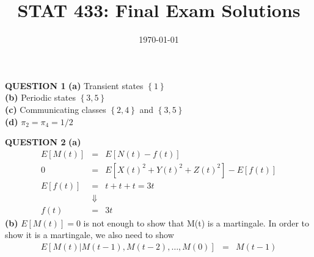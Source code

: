 \documentclass{amsart}
\theoremstyle{definition}
\theoremstyle{remark}
\numberwithin{equation}{section}
\begin{document}
\title{STAT 433: Final Exam Solutions}

\date{ \today}





\maketitle
\flushleft
{\bf QUESTION 1}
\newline
{\bf (a)}
Transient states $\left\{1\right\}$ \\
{\bf (b)}
Periodic states $\left\{3,5\right\}$ \\
{\bf (c)} Communicating classes $\left\{2,4\right\}$ and
$\left\{3,5\right\}$ \\
 {\bf (d)}
 $\pi_2=\pi_4=1/2$
\bigskip

{\bf QUESTION 2}
\newline
{\bf (a)}
\newline
\begin{eqnarray}
\nonumber E[M(t)]&=&E[N(t)-f(t)] \\
\nonumber 0&=&E[X(t)^2+Y(t)^2+Z(t)^2]-E[f(t)] \\
\nonumber E[f(t)]&=&t+t+t=3t \\
\nonumber &\Downarrow& \\
\nonumber f(t)&=&3t
\end{eqnarray}
 {\bf (b)}
\newline
$E[M(t)]=0$ is not enough to show that M(t) is a martingale. In
order to show it is a martingale, we also need to show
\begin{eqnarray}
\nonumber E[M(t)|M(t-1),M(t-2),\ldots,M(0)]&=&M(t-1)
\end{eqnarray}
\bigskip
\end{document}
